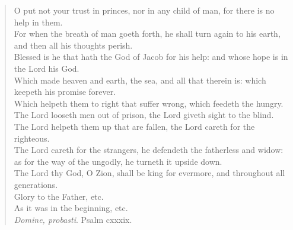 \documentclass[
]{book}
\begin{document}
\begin{quote}
O put not your trust in princes, nor in any child of man, for there is no help in them.\\
For when the breath of man goeth forth, he shall turn again to his earth, and then all his thoughts perish.\\
Blessed is he that hath the God of Jacob for his help: and whose hope is in the Lord his God.\\
Which made heaven and earth, the sea, and all that therein is: which keepeth his promise forever.\\
Which helpeth them to right that suffer wrong, which feedeth the hungry.\\
The Lord looseth men out of prison, the Lord giveth sight to the blind.\\
The Lord helpeth them up that are fallen, the Lord careth for the righteous.\\
The Lord careth for the strangers, he defendeth the fatherless and widow: as for the way of the ungodly, he turneth it upside down.\\
The Lord thy God, O Zion, shall be king for evermore, and throughout all generations.\\
Glory to the Father, etc.\\
As it was in the beginning, etc.\\

\emph{Domine, probasti}. Psalm cxxxix.


\end{quote}
\end{document}
